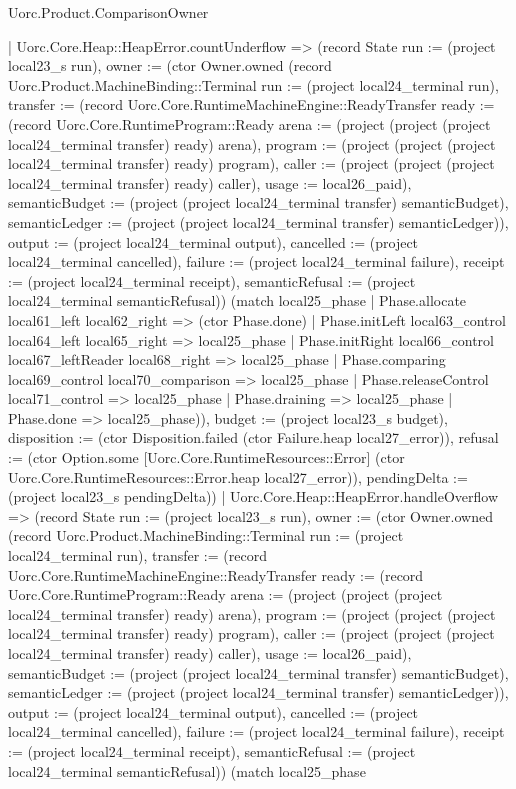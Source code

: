 \begin{lexlean}{Uorc.Product.ComparisonOwner}
\begin{semanticmodule}
{    | Uorc.Core.Heap::HeapError.countUnderflow => (record State {run := (project local23_s run), owner := (ctor Owner.owned (record Uorc.Product.MachineBinding::Terminal {run := (project local24_terminal run), transfer := (record Uorc.Core.RuntimeMachineEngine::ReadyTransfer {ready := (record Uorc.Core.RuntimeProgram::Ready {arena := (project (project (project local24_terminal transfer) ready) arena), program := (project (project (project local24_terminal transfer) ready) program), caller := (project (project (project local24_terminal transfer) ready) caller), usage := local26_paid}), semanticBudget := (project (project local24_terminal transfer) semanticBudget), semanticLedger := (project (project local24_terminal transfer) semanticLedger)}), output := (project local24_terminal output), cancelled := (project local24_terminal cancelled), failure := (project local24_terminal failure), receipt := (project local24_terminal receipt), semanticRefusal := (project local24_terminal semanticRefusal)}) (match local25_phase
      | Phase.allocate local61_left local62_right => (ctor Phase.done)
      | Phase.initLeft local63_control local64_left local65_right => local25_phase
      | Phase.initRight local66_control local67_leftReader local68_right => local25_phase
      | Phase.comparing local69_control local70_comparison => local25_phase
      | Phase.releaseControl local71_control => local25_phase
      | Phase.draining => local25_phase
      | Phase.done => local25_phase)), budget := (project local23_s budget), disposition := (ctor Disposition.failed (ctor Failure.heap local27_error)), refusal := (ctor Option.some [Uorc.Core.RuntimeResources::Error] (ctor Uorc.Core.RuntimeResources::Error.heap local27_error)), pendingDelta := (project local23_s pendingDelta)})
    | Uorc.Core.Heap::HeapError.handleOverflow => (record State {run := (project local23_s run), owner := (ctor Owner.owned (record Uorc.Product.MachineBinding::Terminal {run := (project local24_terminal run), transfer := (record Uorc.Core.RuntimeMachineEngine::ReadyTransfer {ready := (record Uorc.Core.RuntimeProgram::Ready {arena := (project (project (project local24_terminal transfer) ready) arena), program := (project (project (project local24_terminal transfer) ready) program), caller := (project (project (project local24_terminal transfer) ready) caller), usage := local26_paid}), semanticBudget := (project (project local24_terminal transfer) semanticBudget), semanticLedger := (project (project local24_terminal transfer) semanticLedger)}), output := (project local24_terminal output), cancelled := (project local24_terminal cancelled), failure := (project local24_terminal failure), receipt := (project local24_terminal receipt), semanticRefusal := (project local24_terminal semanticRefusal)}) (match local25_phase
}}
\end{semanticmodule}
\end{lexlean}
